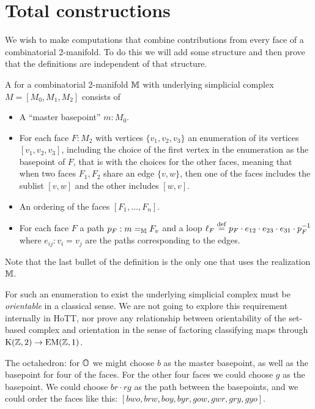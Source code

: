 \section{Total constructions}
We wish to make computations that combine contributions from every face of a combinatorial 2-manifold. To do this we will add some structure and then prove that the definitions are independent of that structure.

\begin{mydef}
A  for a combinatorial 2-manifold \( \mathbb{M} \) with underlying simplicial complex \( M=[M_0, M_1, M_2] \) consists of
\begin{itemize}
\item A ``master basepoint'' \( m:M_0 \).
\item For each face \( F:M_2 \) with vertices \( \{v_1, v_2, v_3\} \) an enumeration of its vertices \( [v_1, v_2, v_3] \), including the choice of the first vertex in the enumeration as the basepoint of \( F \), that is  with the choices for the other faces, meaning that when two faces \( F_1,F_2 \) share an edge \( \{v, w\} \), then one of the faces includes the sublist \( [v, w] \) and the other includes \( [w, v] \).
\item An ordering of the faces \( [F_1,\ldots,F_n] \).
\item For each face \( F \) a path \( p_F:m=_{\mathbb{M}} F_v \) and a loop \( \ell_F\stackrel{\mathrm{def}}{=} p_F\cdot e_{12}\cdot e_{23}\cdot e_{31}\cdot p_F^{-1} \) where \( e_{ij}:v_i=v_j \) are the paths corresponding to the edges. 
\end{itemize}
\end{mydef}

Note that the last bullet of the definition is the only one that uses the realization \( \mathbb{M} \).

\begin{mynote}
For such an enumeration to exist the underlying simplicial complex must be \emph{orientable} in a classical sense. We are not going to explore this requirement internally in HoTT, nor prove any relationship between orientability of the set-based complex and orientation in the sense of factoring classifying maps through \( \mathrm{K}(\mathbb{Z},2)\to\mathrm{EM}(\mathbb{Z},1) \).
\end{mynote}

\begin{myex}
The octahedron: for \( \mathbb{O} \) we might choose \( b \) as the master basepoint, as well as the basepoint for four of the faces. For the other four faces we could choose \( g \) as the basepoint. We could choose \( br\cdot rg \) as the path between the basepoints, and we could order the faces like this: \( [bwo, brw, boy, byr, gow, gwr, gry, gyo] \).
\end{myex}

